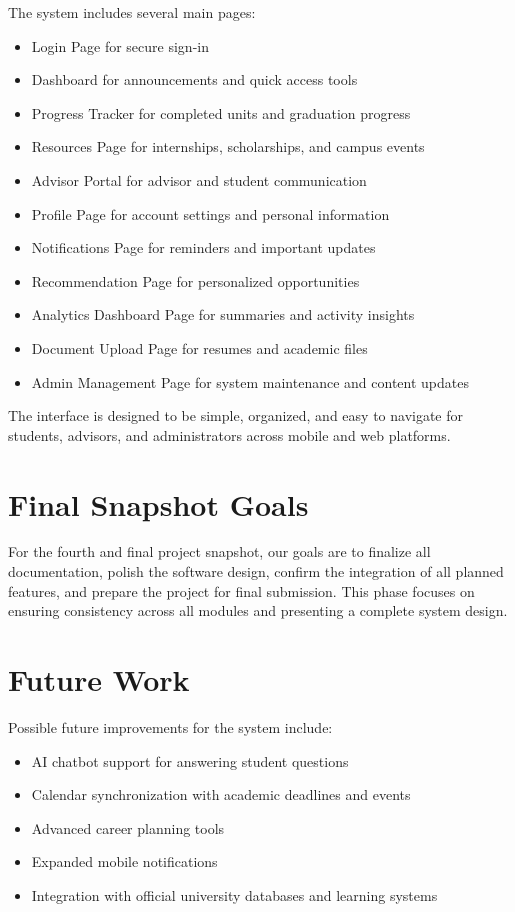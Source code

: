 \documentclass[12pt]{article}
\begin{document}
The system includes several main pages:

\begin{itemize}
\item Login Page for secure sign-in
\item Dashboard for announcements and quick access tools
\item Progress Tracker for completed units and graduation progress
\item Resources Page for internships, scholarships, and campus events
\item Advisor Portal for advisor and student communication
\item Profile Page for account settings and personal information
\item Notifications Page for reminders and important updates
\item Recommendation Page for personalized opportunities
\item Analytics Dashboard Page for summaries and activity insights
\item Document Upload Page for resumes and academic files
\item Admin Management Page for system maintenance and content updates
\end{itemize}

The interface is designed to be simple, organized, and easy to navigate for students, advisors, and administrators across mobile and web platforms.

\section{Final Snapshot Goals}

For the fourth and final project snapshot, our goals are to finalize all documentation, polish the software design, confirm the integration of all planned features, and prepare the project for final submission.
This phase focuses on ensuring consistency across all modules and presenting a complete system design.

\section{Future Work}

Possible future improvements for the system include:

\begin{itemize}
\item AI chatbot support for answering student questions
\item Calendar synchronization with academic deadlines and events
\item Advanced career planning tools
\item Expanded mobile notifications
\item Integration with official university databases and learning systems
\end{itemize}
\end{document}

